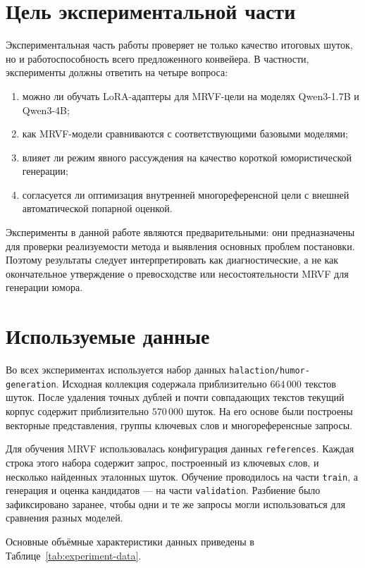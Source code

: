 \section{Цель экспериментальной части}

Экспериментальная часть работы проверяет не только качество итоговых шуток, но и работоспособность всего предложенного конвейера. В частности, эксперименты должны ответить на четыре вопроса:
\begin{enumerate}
    \item можно ли обучать LoRA-адаптеры для MRVF-цели на моделях Qwen3-1.7B и Qwen3-4B;
    \item как MRVF-модели сравниваются с соответствующими базовыми моделями;
    \item влияет ли режим явного рассуждения на качество короткой юмористической генерации;
    \item согласуется ли оптимизация внутренней многореференсной цели с внешней автоматической попарной оценкой.
\end{enumerate}

Эксперименты в данной работе являются предварительными: они предназначены для проверки реализуемости метода и выявления основных проблем постановки. Поэтому результаты следует интерпретировать как диагностические, а не как окончательное утверждение о превосходстве или несостоятельности MRVF для генерации юмора.

\section{Используемые данные}

Во всех экспериментах используется набор данных \texttt{halaction/humor-generation}. Исходная коллекция содержала приблизительно \(664\,000\) текстов шуток. После удаления точных дублей и почти совпадающих текстов текущий корпус содержит приблизительно \(570\,000\) шуток. На его основе были построены векторные представления, группы ключевых слов и многореференсные запросы.

Для обучения MRVF использовалась конфигурация данных \texttt{references}. Каждая строка этого набора содержит запрос, построенный из ключевых слов, и несколько найденных эталонных шуток. Обучение проводилось на части \texttt{train}, а генерация и оценка кандидатов --- на части \texttt{validation}. Разбиение было зафиксировано заранее, чтобы одни и те же запросы могли использоваться для сравнения разных моделей.

Основные объёмные характеристики данных приведены в Таблице~\ref{tab:experiment-data}.

